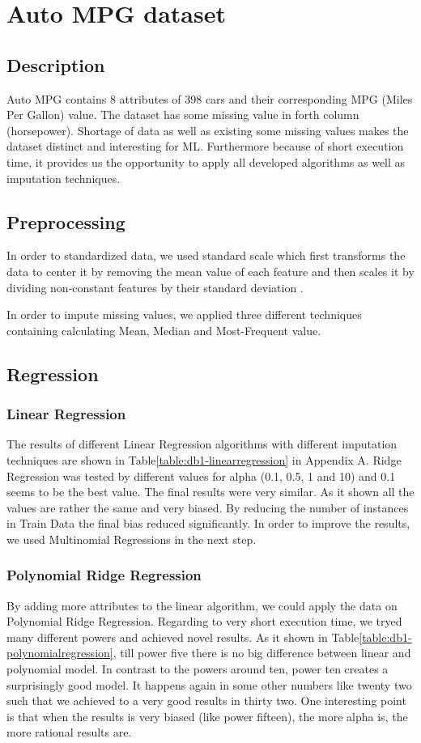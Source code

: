 \section{Auto MPG dataset}
\subsection{Description}
Auto MPG contains 8 attributes of 398 cars  and their corresponding MPG (Miles Per Gallon) value. The dataset has some missing value in forth column (horsepower). Shortage of data as well as existing some missing values makes the dataset distinct and interesting for ML. Furthermore because of short execution time, it provides us the opportunity to apply all developed algorithms as well as imputation techniques.

\subsection{Preprocessing}
In order to standardized data, we used standard scale which first transforms the data to center it by removing the mean value of each feature and then scales it by dividing non-constant features by their standard deviation \cite{scikitstandardization}.

In order to impute missing values, we applied three different techniques containing calculating Mean, Median and Most-Frequent value.

\subsection{Regression}
\subsubsection{Linear Regression}
The results of different Linear Regression algorithms with different imputation techniques are shown in Table\ref{table:db1-linearregression} in Appendix A. Ridge Regression was tested by different values for alpha (0.1, 0.5, 1 and 10) and 0.1 seems to be the best value. The final results were very similar. As it shown all the values are rather the same and very biased. By reducing the number of instances in Train Data the final bias reduced significantly. In order to improve the results, we used Multinomial Regressions in the next step.

\subsubsection{Polynomial Ridge Regression}
By adding more attributes to the linear algorithm, we could apply the data on Polynomial Ridge Regression. Regarding to very short execution time, we tryed many different powers and achieved novel results. As it shown in Table\ref{table:db1-polynomialregression}, till power five there is no big difference between linear and polynomial model. In contrast to the powers around ten, power ten creates a surprisingly good model. It happens again in some other numbers like twenty two such that we achieved to a very good results in thirty two. One interesting point is that when the results is very biased (like power fifteen), the more alpha is, the more rational results are.

